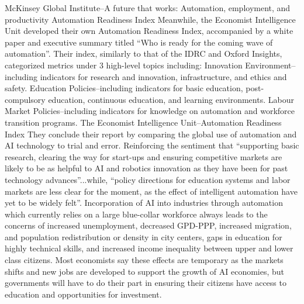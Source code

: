 \documentclass[conference]{IEEEtran}
\begin{document}
McKinsey Global Institute--A future that works: Automation, employment, and productivity
Automation Readiness Index
Meanwhile, the Economist Intelligence Unit developed their own Automation Readiness Index, accompanied by a white paper and executive summary titled ``Who is ready for the coming wave of automation''. Their index, similarly to that of the IDRC and Oxford Insights, categorized metrics under 3 high-level topics including:
Innovation Environment--including indicators for research and innovation, infrastructure, and ethics and safety.
Education Policies--including indicators for basic education, post-compulsory education, continuous education, and learning environments.
Labour Market Policies--including indicators for knowledge on automation and workforce transition programs.
The Economist Intelligence Unit--Automation Readiness Index
They conclude their report by comparing the global use of automation and AI technology to trial and error. Reinforcing the sentiment that ``supporting basic research, clearing the way for start-ups and ensuring competitive markets are likely to be as helpful to AI and robotics innovation as they have been for past technology advances''...while, ``policy directions for education systems and labor markets are less clear for the moment, as the effect of intelligent automation have yet to be widely felt''.
Incorporation of AI into industries through automation which currently relies on a large blue-collar workforce always leads to the concerns of increased unemployment, decreased GPD-PPP, increased migration, and population redistribution or density in city centers, gaps in education for highly technical skills, and increased income inequality between upper and lower class citizens. Most economists say these effects are temporary as the markets shifts and new jobs are developed to support the growth of AI economies, but governments will have to do their part in ensuring their citizens have access to education and opportunities for investment.
\end{document}
